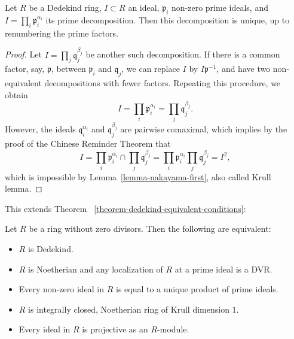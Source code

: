 \begin{theorem}
\label{theorem-dedekind-prime-factorization-unique}
Let $R$ be a Dedekind ring, $I\subset R$
an ideal, $\mathfrak{p}_i$ non-zero prime
ideals, and
$I=\prod_i \mathfrak{p}_i^{\alpha_i}$
its prime decomposition.
Then this decomposition is unique, up to
renumbering the prime factors.
\end{theorem}

\begin{proof}
Let
$I=\prod_j \mathfrak{q}_j^{\beta_j}$
be another such decomposition.
If there is a common factor, say,
$\mathfrak{p}$, between
$\mathfrak{p}_i$ and $\mathfrak{q}_j$,
we can replace $I$ by
$I\mathfrak{p}^{-1}$, and have two
non-equivalent decompositions with fewer
factors.
Repeating this procedure, we obtain
$$
I=\prod_i \mathfrak{p}_i^{\alpha_i}
=\prod_j \mathfrak{q}_j^{\beta_j}.
$$
However, the ideals
$\mathfrak{q}_i^{\alpha_i}$ and
$\mathfrak{q}_j^{\beta_j}$ are pairwise
comaximal, which implies by the proof of
the Chinese Reminder Theorem that
$$
I=\prod_i \mathfrak{p}_i^{\alpha_i}
\cap \prod_j \mathfrak{q}_j^{\beta_j}
=\prod_i \mathfrak{p}_i^{\alpha_i}
\prod_j \mathfrak{q}_j^{\beta_j}
=I^2,
$$
which is impossible by
Lemma~\ref{lemma-nakayama-first},
also called Krull lemma.
\end{proof}

\medskip\noindent
This extends
Theorem~
\ref{theorem-dedekind-equivalent-conditions}:

\begin{theorem}
\label{theorem-dedekind-equivalent-conditions-full}
Let $R$ be a ring without zero divisors.
Then the following are equivalent:
\begin{itemize}
\item[(i)] $R$ is Dedekind.
\item[(ii)] $R$ is Noetherian and any
localization of $R$ at a prime ideal is
a DVR.
\item[(iii)] Every non-zero ideal in $R$
is equal to a unique product of prime
ideals.
\item[(iv)] $R$ is integrally closed,
Noetherian ring of Krull dimension $1$.
\item[(v)] Every ideal in $R$ is
projective as an $R$-module.
\end{itemize}
\end{theorem}

